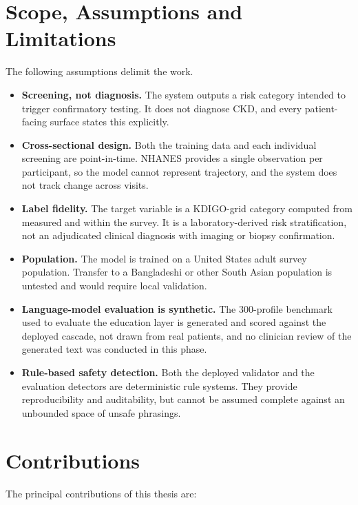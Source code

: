 \section{Scope, Assumptions and Limitations}
\label{sec:scope}

The following assumptions delimit the work.

\begin{itemize}
  \item \textbf{Screening, not diagnosis.} The system outputs a risk category
        intended to trigger confirmatory testing. It does not diagnose CKD, and
        every patient-facing surface states this explicitly.
  \item \textbf{Cross-sectional design.} Both the training data and each
        individual screening are point-in-time. NHANES provides a single
        observation per participant, so the model cannot represent trajectory,
        and the system does not track change across visits.
  \item \textbf{Label fidelity.} The target variable is a KDIGO-grid category
        computed from measured \eGFR{} and \UACR{} within the survey. It is a
        laboratory-derived risk stratification, not an adjudicated clinical
        diagnosis with imaging or biopsy confirmation.
  \item \textbf{Population.} The model is trained on a United States adult
        survey population. Transfer to a Bangladeshi or other South Asian
        population is untested and would require local validation.
  \item \textbf{Language-model evaluation is synthetic.} The 300-profile
        benchmark used to evaluate the education layer is generated and scored
        against the deployed cascade, not drawn from real patients, and no
        clinician review of the generated text was conducted in this phase.
  \item \textbf{Rule-based safety detection.} Both the deployed validator and
        the evaluation detectors are deterministic rule systems. They provide
        reproducibility and auditability, but cannot be assumed complete against
        an unbounded space of unsafe phrasings.
\end{itemize}

\section{Contributions}
\label{sec:contributions}

The principal contributions of this thesis are:

